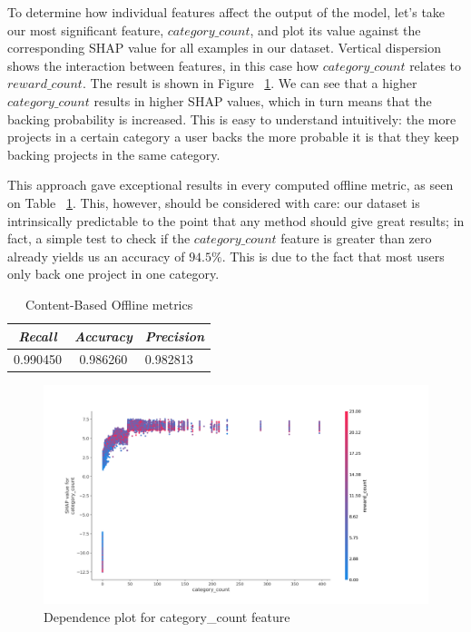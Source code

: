 \documentclass[cic,tc,english]{iiufrgs}
\newcommand{\adriano}[1]{#1}
\begin{document}
To determine how individual features affect the output of the model, let's take our most significant feature, $category\_count$, and plot its value against the corresponding SHAP value for all examples in our dataset. Vertical dispersion shows the interaction between features, in this case how $category\_count$ relates to $reward\_count$. The result is shown in Figure ~\ref{fig:category_count}. \adriano{We can see that a higher $category\_count$ results in higher SHAP values, which in turn means that the backing probability is increased. This is easy to understand intuitively: the more projects in a certain category a user backs the more probable it is that they keep backing projects in the same category.}

This approach gave exceptional results in every computed offline metric, as seen on Table  ~\ref{tbl:cb_offline_metrics}. This, however, should be considered with care: our dataset is intrinsically predictable to the point that any method should give great results; in fact, a simple test to check if the $category\_count$ feature is greater than zero already yields us an accuracy of $94.5\%$. This is due to the fact that most users only back one project in one category.

\begin{table}[ht!]
    \caption{Content-Based Offline metrics}
    \centering
        \begin{tabular}{c|c|p{1.7cm}}
          \hline
          \textit{Recall}  &   \textit{Accuracy}  &   \textit{Precision} \\
          \hline
          \hline
          0.990450           & 0.986260 &  0.982813 \\
          \hline
        \end{tabular}
    \label{tbl:cb_offline_metrics}
\end{table}

\begin{figure}[ht!]
    \caption{Dependence plot for category\_count feature}
    \begin{center}
        \includegraphics[width=\textwidth]{category_count}
    \end{center}
    \label{fig:category_count}
\end{figure}
\end{document}
